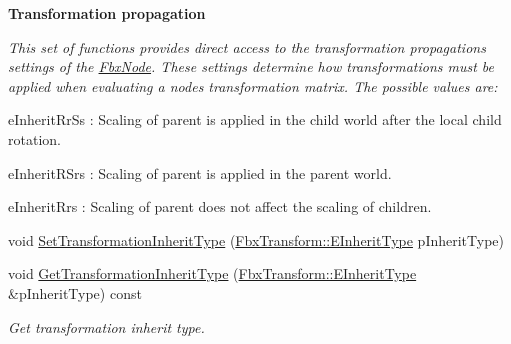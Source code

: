 \begin{Indent}\textbf{ Transformation propagation}\par
{\em This set of functions provides direct access to the transformation propagations settings of the \hyperlink{class_fbx_node}{Fbx\+Node}. These settings determine how transformations must be applied when evaluating a node\textquotesingle{}s transformation matrix. The possible values are\+:
\begin{DoxyItemize}
\item e\+Inherit\+Rr\+Ss \+: Scaling of parent is applied in the child world after the local child rotation.
\item e\+Inherit\+R\+Srs \+: Scaling of parent is applied in the parent world.
\item e\+Inherit\+Rrs \+: Scaling of parent does not affect the scaling of children. 
\end{DoxyItemize}}\begin{DoxyCompactItemize}
\item 
void \hyperlink{class_fbx_node_a98be0727d8a7a17bb163fa8ee3c5909f}{Set\+Transformation\+Inherit\+Type} (\hyperlink{class_fbx_transform_ac1ab8f75b4873723daa68c57f999b10f}{Fbx\+Transform\+::\+E\+Inherit\+Type} p\+Inherit\+Type)
\item 
void \hyperlink{class_fbx_node_a7df3b59153a6183988ea20c52ee7df9f}{Get\+Transformation\+Inherit\+Type} (\hyperlink{class_fbx_transform_ac1ab8f75b4873723daa68c57f999b10f}{Fbx\+Transform\+::\+E\+Inherit\+Type} \&p\+Inherit\+Type) const
\begin{DoxyCompactList}\small\item\em Get transformation inherit type. \end{DoxyCompactList}\end{DoxyCompactItemize}
\end{Indent}
